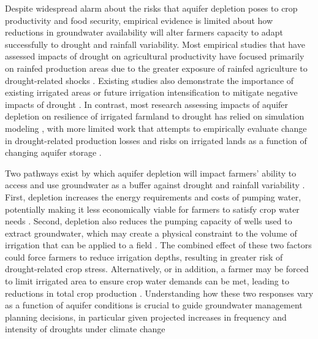 \documentclass[
]{article}
\begin{document}
Despite widespread alarm about the risks that aquifer depletion poses to crop productivity and food security, empirical evidence is limited about how reductions in groundwater availability will alter farmers capacity to adapt successfully to drought and rainfall variability.  
Most empirical studies that have assessed impacts of drought on agricultural productivity have focused primarily on rainfed production areas due to the greater exposure of rainfed agriculture to drought-related shocks \citep{schlenker2009nonlinear,lobell2014greater,schlenker2010robust,zhou2020connections,borgomeo2020impact}. Existing studies also demonstrate the importance of existing irrigated areas or future irrigation intensification to mitigate negative impacts of drought \citep{kuwayama2019estimating,zipper2016drought,zhu2022untangling,zhu2022warming,lu2020mapping,davis2019sensitivity,li2018changes}. In contrast, most research assessing impacts of aquifer depletion on resilience of irrigated farmland to drought has relied on simulation modeling \citep{foster2015well,cotterman2018groundwater,kahil2015modeling,yoon2021coupled,rad2020mod}, with more limited work that attempts to empirically evaluate change in drought-related production losses and risks on irrigated lands as a function of changing aquifer storage \citep{jain2021groundwater,suter2021depletion}.

Two pathways exist by which aquifer depletion will impact farmers’ ability to access and use groundwater as a buffer against drought and rainfall variability \citep{foster2015analysis}. First, depletion increases the energy requirements and costs of pumping water, potentially making it less economically viable for farmers to satisfy crop water needs \citep{mieno2017price, bhattarai2021impact}. Second, depletion also reduces the pumping capacity of wells used to extract groundwater, which may create a physical constraint to the volume of irrigation that can be applied to a field \citep{konikow2005groundwater, foster2014modeling, hrozencik2017heterogeneous}. The combined effect of these two factors could force farmers to reduce irrigation depths, resulting in greater risk of drought-related crop stress. Alternatively, or in addition, a farmer may be forced to limit irrigated area to ensure crop water demands can be met, leading to reductions in total crop production \citep{foster2014modeling, rad2020effects}. Understanding how these two responses vary as a function of aquifer conditions is crucial to guide groundwater management planning decisions, in particular given projected increases in frequency and intensity of droughts under climate change \citep{ukkola2020robust,chiang2021evidence,cook2020twenty}
\end{document}
